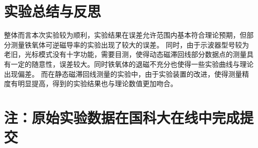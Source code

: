 \documentclass[UTF-8,twoside,cs4size]{ctexart}
\begin{document}
\section{实验总结与反思}
整体而言本次实验较为顺利，实验结果在误差允许范围内基本符合理论预期，但部分测量铁氧体可逆磁导率的实验出现了较大的误差。
同时，由于示波器型号较为老旧，光标模式没有十字功能，需要目测，使得动态磁滞回线部分数据点的测量具有一定的随意性，误差较大。同时铁氧体的退磁不充分也使得一些实验曲线与理论出现偏差。
而在静态磁滞回线测量的实验中，由于实验装置的改进，使得测量精度有明显提高，得到的实验结果也与理论数值更加吻合。

\section*{注：原始实验数据在国科大在线中完成提交}
\end{document}
